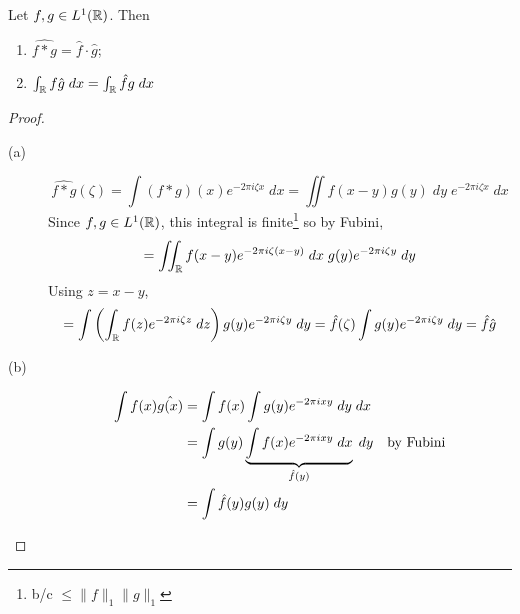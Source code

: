 \begin{prop}
    Let $f,g \in L^1(\mathbb{R})$. Then
    \begin{enumerate}
        \item $\widehat{f*g} = \hat{f} \cdot \hat{g}$;
        \item $\int_{\mathbb{R}} f \hat{g} \; dx = \int_{\mathbb{R}} \hat{f} g \; dx$ 
    \end{enumerate} 
\end{prop}
\begin{proof} \leavevmode
    \begin{description}
        \item[(a)] 
        \[
            \widehat{f * g}(\zeta) = \int (f*g)(x) e^{-2 \pi i \zeta x} \; dx = \iint f(x-y) g(y) \; dy \; e^{-2 \pi i \zeta x} \; dx
        \]  
        Since $f, g \in L^1(\mathbb{R})$, this integral is finite\footnote{b/c $\leq \| f \|_1 \| g \|_1$ } so 
        by Fubini,
        \[
            = \iint_{\mathbb{R}} f(x-y) e^{-2 \pi i \zeta (x-y)} \; dx \; g(y) e^{-2 \pi i \zeta y} \; dy
        \] 
        Using $z = x-y$, 
        \[
            = \int \left( \int_{\mathbb{R}} f(z) e^{-2 \pi i \zeta z} \; dz \right) g(y) e^{-2 \pi i \zeta y} \; dy
            = \hat{f}(\zeta) \int g(y) e^{-2 \pi i \zeta y} \; dy = \hat{f} \hat{g}
        \]  

        \item[(b)] 
        \begin{align*}
            \int f(x) \hat{g(x)} &= \int f(x) \int g(y) e^{-2 \pi i x y} \; dy \; dx \\
            &= \int g(y) \underbrace{\int f(x) e^{-2 \pi i x y} \; dx}_{\hat{f}(y)} \; dy \quad \text{by Fubini} \\ 
            &= \int \hat{f}(y) g(y) \; dy \qedhere \\
        \end{align*}
    \end{description}
\end{proof}

